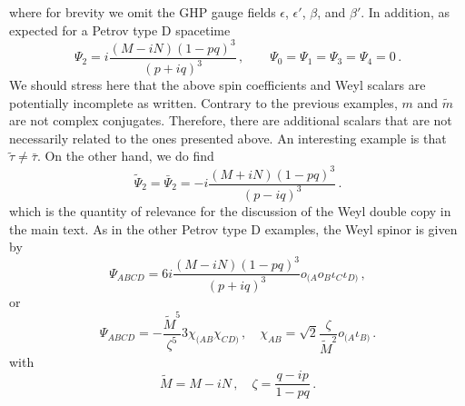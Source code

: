 where for brevity we omit the GHP gauge fields $\epsilon$, $\epsilon'$, $\beta$, and $\beta'$. In addition, as expected for a Petrov type D spacetime
\begin{equation}
\Psi_2 = i \frac{(M-i N)(1-pq)^3}{(p+iq)^3} \, ,\quad  \quad \Psi_0 = \Psi_1 = \Psi_3 = \Psi_4 = 0 \, .
\end{equation}
We should stress here that the above spin coefficients and Weyl scalars are potentially incomplete as written. Contrary to the previous examples, $m$ and $\tilde{m}$ are not complex conjugates. Therefore, there are additional scalars that are not necessarily related to the ones presented above. An interesting example is that $\tilde{\tau} \neq \bar{\tau}$. On the other hand, we do find
\begin{equation}
\tilde{\Psi}_2 = \bar{\Psi}_2 = -i \frac{(M+i N)(1-pq)^3}{(p-iq)^3} \, .
\end{equation}
which is the quantity of relevance for the discussion of the Weyl double copy in the main text.
As in the other Petrov type D examples, the Weyl spinor is given by
\begin{equation}
\Psi_{ABCD} = 6 i  \frac{(M-i N)(1-pq)^3}{(p+iq)^3}o_{(A} o_B \iota_C \iota_{D)} \, ,
\end{equation}
or
\begin{equation}
\Psi_{ABCD} = -  \frac{\tilde{M}^5}{\zeta^5} 3 \chi_{(AB}  \chi_{CD)} \, , \quad \chi_{AB} = \sqrt{2} \frac{\zeta}{\tilde{M}^2} o_{(A} \iota_{B)} \, .
\end{equation}
with
\begin{equation}
\tilde{M} = M-i N \, , \quad 	\zeta = \frac{q-ip}{1-pq} \, .
\end{equation}

